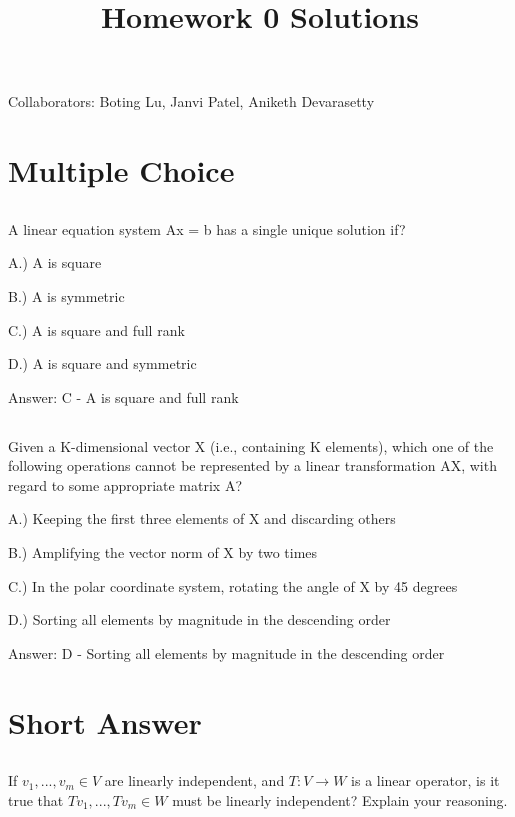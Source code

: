 \documentclass[12pt]{article}
\begin{document}
\title{Homework 0 Solutions}

Collaborators: Boting Lu, Janvi Patel, Aniketh Devarasetty

\section{Multiple Choice}

\subsection{}
A linear equation system Ax = b has a single unique solution if?

A.) A is square

B.) A is symmetric

C.) A is square and full rank

D.) A is square and symmetric

\color{blue}
Answer: C - A is square and full rank

\color{black}
\subsection{}
Given a K-dimensional vector X (i.e., containing K elements), which one of the following operations cannot be represented by a linear transformation AX, with regard to some appropriate matrix A?

A.) Keeping the first three elements of X and discarding others

B.) Amplifying the vector norm of X by two times

C.) In the polar coordinate system, rotating the angle of X by 45 degrees

D.) Sorting all elements by magnitude in the descending order

\color{blue}
Answer: D - Sorting all elements by magnitude in the descending order

\color{black}
\section{Short Answer}

\subsection{}

\subsubsection{}
If $v_1, ..., v_m \in V$ are linearly independent, and $T : V \rightarrow W$ is a linear operator, is it true that $Tv_1, ..., Tv_m \in W$ must be linearly independent? Explain your reasoning.
\end{document}

